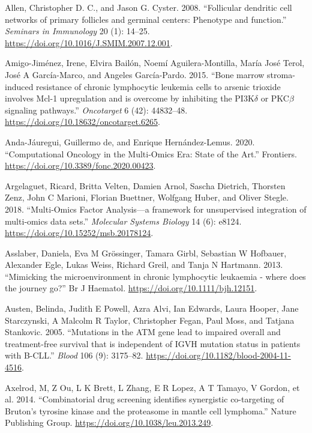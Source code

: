 \documentclass[11pt, a4paper, twosided]{book}
\newenvironment{CSLReferences}%
  {}%
  {\par}
\begin{document}
\begin{CSLReferences}{1}{0}
\leavevmode{}%
Allen, Christopher D. C., and Jason G. Cyster. 2008. {``{Follicular dendritic cell networks of primary follicles and germinal centers: Phenotype and function}.''} \emph{Seminars in Immunology} 20 (1): 14--25. \url{https://doi.org/10.1016/J.SMIM.2007.12.001}.

\leavevmode{}%
Amigo-Jiménez, Irene, Elvira Bailón, Noemí Aguilera-Montilla, María José Terol, José A García-Marco, and Angeles García-Pardo. 2015. {``{Bone marrow stroma-induced resistance of chronic lymphocytic leukemia cells to arsenic trioxide involves Mcl-1 upregulation and is overcome by inhibiting the PI3K\(\delta\) or PKC\(\beta\) signaling pathways}.''} \emph{Oncotarget} 6 (42): 44832--48. \url{https://doi.org/10.18632/oncotarget.6265}.

\leavevmode{}%
Anda-Jáuregui, Guillermo de, and Enrique Hernández-Lemus. 2020. {``{Computational Oncology in the Multi-Omics Era: State of the Art}.''} Frontiers. \url{https://doi.org/10.3389/fonc.2020.00423}.

\leavevmode{}%
Argelaguet, Ricard, Britta Velten, Damien Arnol, Sascha Dietrich, Thorsten Zenz, John C Marioni, Florian Buettner, Wolfgang Huber, and Oliver Stegle. 2018. {``{Multi‐Omics Factor Analysis---a framework for unsupervised integration of multi‐omics data sets}.''} \emph{Molecular Systems Biology} 14 (6): e8124. \url{https://doi.org/10.15252/msb.20178124}.

\leavevmode{}%
Asslaber, Daniela, Eva M Grössinger, Tamara Girbl, Sebastian W Hofbauer, Alexander Egle, Lukas Weiss, Richard Greil, and Tanja N Hartmann. 2013. {``{Mimicking the microenvironment in chronic lymphocytic leukaemia - where does the journey go?}''} Br J Haematol. \url{https://doi.org/10.1111/bjh.12151}.

\leavevmode{}%
Austen, Belinda, Judith E Powell, Azra Alvi, Ian Edwards, Laura Hooper, Jane Starczynski, A Malcolm R Taylor, Christopher Fegan, Paul Moss, and Tatjana Stankovic. 2005. {``{Mutations in the ATM gene lead to impaired overall and treatment-free survival that is independent of IGVH mutation status in patients with B-CLL}.''} \emph{Blood} 106 (9): 3175--82. \url{https://doi.org/10.1182/blood-2004-11-4516}.

\leavevmode{}%
Axelrod, M, Z Ou, L K Brett, L Zhang, E R Lopez, A T Tamayo, V Gordon, et al. 2014. {``{Combinatorial drug screening identifies synergistic co-targeting of Bruton's tyrosine kinase and the proteasome in mantle cell lymphoma}.''} Nature Publishing Group. \url{https://doi.org/10.1038/leu.2013.249}.


\end{CSLReferences}
\end{document}
